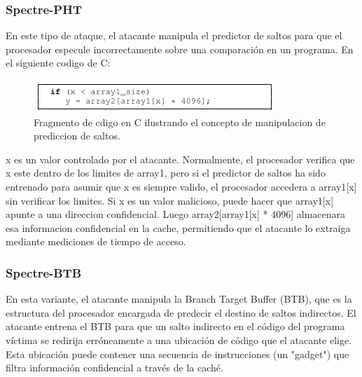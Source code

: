 \documentclass[lettersize,compsoc]{IEEEtran}
\begin{document}
\subsubsection{\textbf{Spectre-PHT}}
En este tipo de ataque, el atacante manipula el predictor de saltos para que el procesador especule incorrectamente sobre una comparación en un programa.
En el siguiente codigo de C:
\begin{figure}[h]
  \centering
  \includegraphics[width=\linewidth]{../codigo_c.png}
  \caption{\small Fragmento de cdigo en C ilustrando el concepto de manipulacion de prediccion de saltos.}
  \label{fig:etiqueta}
\end{figure}
\newline x es un valor controlado por el atacante. Normalmente, el procesador verifica que x este dentro de los limites de array1, pero si el predictor de saltos ha sido entrenado para asumir que x es siempre valido, el procesador accedera a array1[x] sin verificar los limites.
Si x es un valor malicioso, puede hacer que array1[x] apunte a una direccion confidencial. Luego array2[array1[x] * 4096] almacenara esa informacion confidencial en la cache, permitiendo que el atacante lo extraiga mediante mediciones de tiempo de acceso.
\subsubsection{\textbf{Spectre-BTB}}
En esta variante, el atacante manipula la Branch Target Buffer (BTB), que es la estructura del procesador encargada de predecir el destino de saltos indirectos.
El atacante entrena el BTB para que un salto indirecto en el código del programa víctima se redirija erróneamente a una ubicación de código que el atacante elige. Esta ubicación puede contener una secuencia de instrucciones (un "gadget") que filtra información confidencial a través de la caché.
\end{document}
